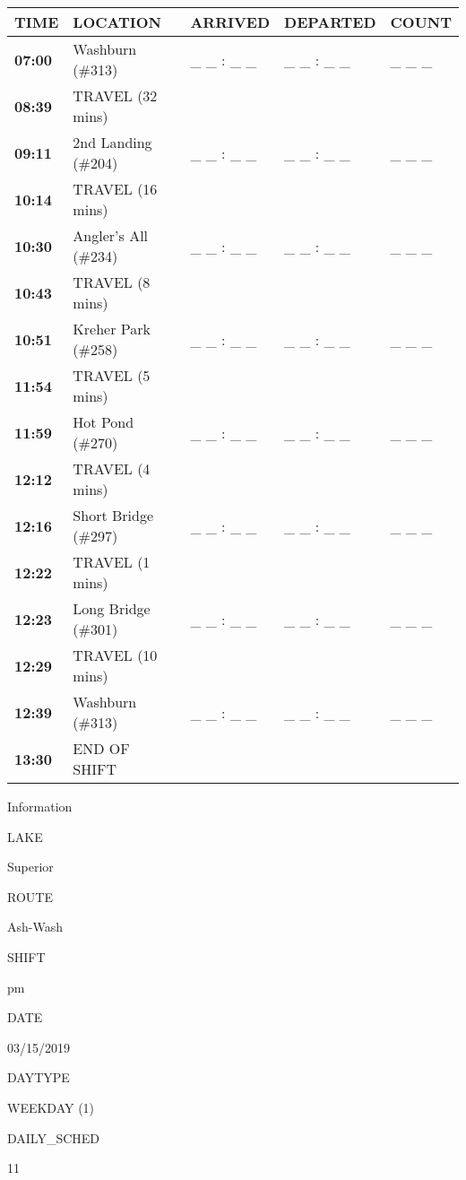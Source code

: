 \documentclass[]{article}
\begin{document}
\begin{tabular}{>{\bfseries}lllll}
\toprule
\textbf{TIME} & \textbf{LOCATION} & \textbf{ARRIVED} & \textbf{DEPARTED} & \textbf{COUNT}\\
\midrule
07:00 & Washburn (\#313) & \_ \_ : \_ \_ & \_ \_ : \_ \_ & \_ \_ \_\\
08:39 & TRAVEL (32 mins) &  &  & \\
09:11 & 2nd Landing (\#204) & \_ \_ : \_ \_ & \_ \_ : \_ \_ & \_ \_ \_\\
10:14 & TRAVEL (16 mins) &  &  & \\
10:30 & Angler's All (\#234) & \_ \_ : \_ \_ & \_ \_ : \_ \_ & \_ \_ \_\\
10:43 & TRAVEL (8 mins) &  &  & \\
10:51 & Kreher Park (\#258) & \_ \_ : \_ \_ & \_ \_ : \_ \_ & \_ \_ \_\\
11:54 & TRAVEL (5 mins) &  &  & \\
11:59 & Hot Pond (\#270) & \_ \_ : \_ \_ & \_ \_ : \_ \_ & \_ \_ \_\\
12:12 & TRAVEL (4 mins) &  &  & \\
12:16 & Short Bridge (\#297) & \_ \_ : \_ \_ & \_ \_ : \_ \_ & \_ \_ \_\\
12:22 & TRAVEL (1 mins) &  &  & \\
12:23 & Long Bridge (\#301) & \_ \_ : \_ \_ & \_ \_ : \_ \_ & \_ \_ \_\\
12:29 & TRAVEL (10 mins) &  &  & \\
12:39 & Washburn (\#313) & \_ \_ : \_ \_ & \_ \_ : \_ \_ & \_ \_ \_\\
13:30 & END OF SHIFT &  &  & \\
\bottomrule
\end{tabular}\newpage

Information

LAKE

Superior

ROUTE

Ash-Wash

SHIFT

pm

DATE

03/15/2019

DAYTYPE

WEEKDAY (1)

DAILY\_SCHED

11

\vspace{24pt}
\end{document}

